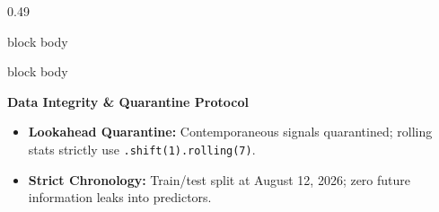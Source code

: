 \documentclass[aspectratio=169, 10pt]{beamer}
\newenvironment{card}[1][]{%
        \begin{beamercolorbox}[rounded=true,shadow=false,wd=\linewidth,sep=3.5pt,#1]{block body}%
        \fontsize{7.8pt}{9.8pt}\selectfont%
    }{%
        \end{beamercolorbox}%
    }
\begin{document}
\begin{frame}[t]
\begin{columns}[T]
\begin{column}{0.49\textwidth}
\begin{card}
\begin{itemize}
                    \end{itemize}                                                                                                                                                                      
                \end{card}                                                                                                                                                                             
                \vspace{0.14cm}                                                                                                                                                                        
                \begin{card}                                                                                                                                                                           
                    \textbf{\color{CoralAccent}Data Integrity \& Quarantine Protocol}\\[0.03cm]                                                                                                        
                    \begin{itemize}\setlength{\itemsep}{1.2pt}                                                                                                                                         
                        \item \textbf{Lookahead Quarantine:} Contemporaneous signals quarantined; rolling stats strictly use \texttt{.shift(1).rolling(7)}.                                            
                        \item \textbf{Strict Chronology:} Train/test split at August 12, 2026; zero future information leaks into predictors.                                                          
                    \end{itemize}                                                                                                                                                                      
                \end{card}                                                                                                                                                                             
            \end{column}                                                                                                                                                                               
        \end{columns}                                                                                                                                                                                  
    \end{frame}                                                                                                                                                                                        
\end{document}
